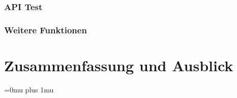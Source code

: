 \documentclass[
book,
a4paper,   
titlepage,  
halfparskip,
12pt        
]{scrartcl}
\begin{document}
\begin{onehalfspacing}
\cite{vaultpki}
\subsubsection{API Test}

\subsubsection{Weitere Funktionen}


\section{Zusammenfassung und Ausblick}
\label{sec:ausblick}


\newpage
\appendix
\Urlmuskip=0mu plus 1mu



\end{onehalfspacing}
\end{document}
